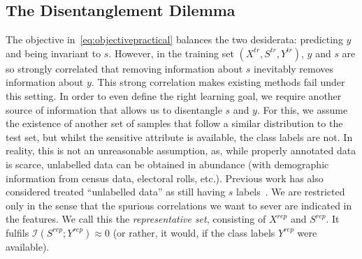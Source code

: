 \subsection{The Disentanglement Dilemma} %
The objective in~\eqref{eq:objectivepractical} balances the two desiderata: predicting $y$ and being invariant to $s$.
However, in the training set $(X^\mathit{tr}, S^\mathit{tr}, Y^\mathit{tr})$,
$y$ and $s$ are so strongly correlated that removing information about $s$ inevitably removes information about $y$.
This strong correlation makes existing methods fail under this setting.
In order to even define the right learning goal,
we require another source of information that allows us to disentangle $s$ and $y$.
For this, we assume the existence of another set of samples that follow a similar distribution to the test set,
but whilst the sensitive attribute is available, the class labels are not.
In reality, this is not an unreasonable assumption,
as, while properly annotated data is scarce, unlabelled data can be obtained in abundance (with demographic information from census data, electoral rolls, etc.).
Previous work has also considered treated ``unlabelled data'' as still having $s$ labels~\citep{wick2019unlocking}.
We are restricted only in the sense that the spurious correlations we want to sever are indicated in the features.
We call this the \emph{representative set}, consisting of $X^\mathit{rep}$ and $S^\mathit{rep}$.
It fulfils $\mathcal{I}(S^\mathit{rep}; Y^\mathit{rep}) \approx 0$
(or rather, it would, if the class labels $Y^\mathit{rep}$ were available).

